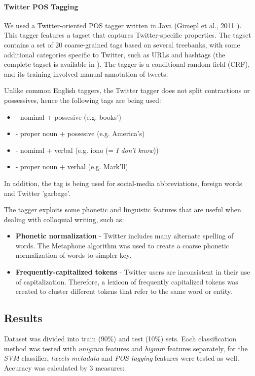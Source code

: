 \documentclass[letterpaper,twocolumn,10pt]{article}
\begin{document}
\paragraph{Twitter POS Tagging}
We used a Twitter-oriented POS tagger written in Java (Gimepl et al., 2011 \cite{POS-Tagging}). This tagger features a tagset that captures Twitter-specific properties. The tagset contains a set of 20 coarse-grained tags based on several treebanks, with some additional categories specific to Twitter, such as URLs and hashtags (the complete tagset is available in \cite{POS-Tagging}). The tagger is a conditional random field (CRF), and its training involved manual annotation of tweets.

Unlike common English taggers, the Twitter tagger does not split contractions or possessives, hence the following tags are being used:

\begin{itemize}[noitemsep, nolistsep]
	\item \textbf{} - nominal + possesive (e.g. books')
	\item \textbf{} - proper noun + possesive (e.g. America's)
	\item \textbf{} - nominal + verbal (e.g. iono (= \textit{I don't know}))
	\item \textbf{} - proper noun + verbal (e.g. Mark'll)
\end{itemize}

In addition, the tag \textbf{} is being used for social-media abbreviations, foreign words and Twitter 'garbage'.

The tagger exploits some phonetic and linguistic features that are useful when dealing with colloquial writing, such as:

\begin{itemize}[noitemsep, nolistsep]
	\item \textbf{Phonetic normalization} - Twitter includes many alternate spelling of words. The Metaphone algorithm was used to create a coarse phonetic normalization of words to simpler key.
	\item \textbf{Frequently-capitalized tokens} - Twitter users are inconsistent in their use of capitalization. Therefore, a lexicon of frequently capitalized tokens was created to cluster different tokens that refer to the same word or entity.
\end{itemize}


\subsection{Results}
Dataset was divided into train (90\%) and test (10\%) sets. Each classification method was tested with \textit{unigram} features and \textit{bigram} features separately, for the \textit{SVM} classifier, \textit{tweets metadata} and \textit{POS tagging} features were tested as well. \\
Accuracy was calculated by 3 measures:
\end{document}
